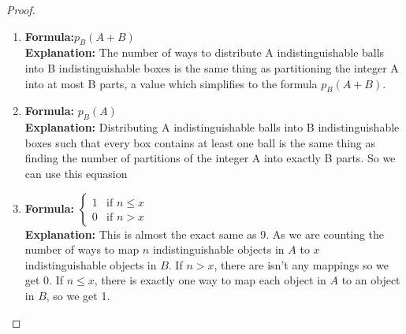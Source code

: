 \documentclass[answers]{exam}
\begin{document}
\begin{solution}
\begin{proof}
\begin{enumerate}
                \item 
                    \textbf{Formula:}$p_B(A+B)$ \\
                    \textbf{Explanation:} 
					The number of ways to distribute A indistinguishable balls into B indistinguishable boxes is the same thing as partitioning the integer A into at most B parts, a value which simplifies to the formula $p_B(A+B)$.
                
                \item 
                    \textbf{Formula:} $p_B(A)$ \\
                    \textbf{Explanation:} 
					Distributing A indistinguishable balls into B indistinguishable boxes such that every box contains at least one ball is the same thing as finding the number of partitions of the integer A into exactly B parts. So we can use this equasion
                
                \item 
                    \textbf{Formula:} $\begin{cases} 1 & \text{if } n \leq x \\ 0 & \text{if } n > x \end{cases}$ \\
                    \textbf{Explanation:} 
					This is almost the exact same as 9. As we are counting the number of ways to map $n$ indistinguishable objects in $A$ to $x$ indistinguishable objects in $B$. If $n > x$, there are isn't any mappings so we get 0. If $n \leq x$, there is exactly one way to map each object in $A$ to an object in $B$, so we get 1.
            \end{enumerate}
		\end{proof}
            
            \end{solution}
			
	
\end{document}
